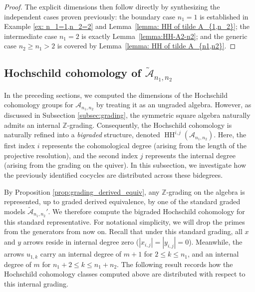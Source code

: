 \documentclass[a4paper, reqno, 11pt]{amsart}
\theoremstyle{definition}
\begin{document}
\begin{proof}
	The explicit dimensions then follow directly by synthesizing the independent cases proven previously: the boundary case $n_1 = 1$ is established in Example \ref{ex: n_1=1,n_2=2} and Lemma~\ref{lemma: HH of tilde A_{1,n_2}}; the intermediate case $n_1 = 2$ is exactly Lemma~\ref{lemma:HH-A2-n2}; and the generic case $n_2 \ge n_1 > 2$ is covered by Lemma~\ref{lemma: HH of tilde A_{n1,n2}}.
\end{proof}

\subsection{Hochschild cohomology of $\widetilde{\mathcal A}_{n_1,n_2}$}\label{grading HH}

In the preceding sections, we computed the dimensions of the Hochschild cohomology groups for $\mathcal{A}_{n_1,n_2}$ by treating it as an ungraded algebra. However, as discussed in Subsection \ref{subsec:grading}, the symmetric square algebra naturally admits an internal $\mathbb{Z}$-grading. Consequently, the Hochschild cohomology is naturally refined into a \textit{bigraded} structure, denoted $\operatorname{HH}^{i,j}(\mathcal{A}_{n_1,n_2})$. Here, the first index $i$ represents the cohomological degree (arising from the length of the projective resolution), and the second index $j$ represents the internal degree (arising from the grading on the quiver). In this subsection, we investigate how the previously identified cocycles are distributed across these bidegrees. 

By Proposition \ref{prop:grading_derived_equiv}, any $\mathbb{Z}$-grading on the algebra is represented, up to graded derived equivalence, by one of the standard graded models $\widetilde{\mathcal A}_{n_1,n_2}'$. We therefore compute the bigraded Hochschild cohomology for this standard representative. For notational simplicity, we will drop the primes from the generators from now on. Recall that under this standard grading, all $x$ and $y$ arrows reside in internal degree zero ($|x_{i,j}| = |y_{i,j}| = 0$). Meanwhile, the arrows $u_{1,k}$ carry an internal degree of $m+1$ for $2 \leq k \leq n_1$, and an internal degree of $m$ for $n_1+2 \leq k \leq n_1+n_2$. The following result records how the Hochschild cohomology classes computed above are distributed with respect to this internal grading.
\end{document}
